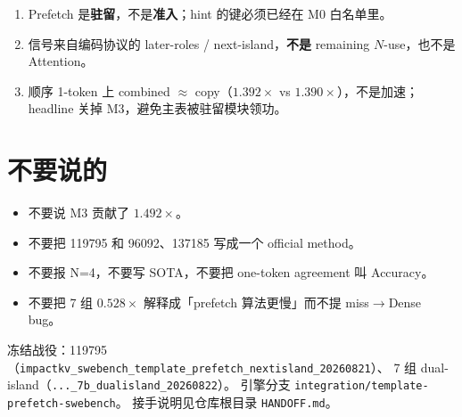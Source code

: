 \documentclass[UTF8,a4paper,11pt,fontset=fandol]{ctexart}
\begin{document}
\begin{enumerate}
  \item Prefetch 是\textbf{驻留}，不是\textbf{准入}；hint 的键必须已经在 M0 白名单里。
  \item 信号来自编码协议的 later-roles / next-island，\textbf{不是} remaining $N$-use，也不是 Attention。
  \item 顺序 1-token 上 combined $\approx$ copy（$1.392\times$ vs $1.390\times$），不是加速；
        headline 关掉 M3，避免主表被驻留模块领功。
\end{enumerate}

\section{不要说的}

\begin{itemize}
  \item 不要说 M3 贡献了 $1.492\times$。
  \item 不要把 119795 和 96092、137185 写成一个 official method。
  \item 不要报 N=4，不要写 SOTA，不要把 one-token agreement 叫 Accuracy。
  \item 不要把 7 组 $0.528\times$ 解释成「prefetch 算法更慢」而不提 miss$\to$Dense bug。
\end{itemize}

\vspace{0.8em}
\noindent\small
冻结战役：119795（\texttt{impactkv\_swebench\_template\_prefetch\_nextisland\_20260821}）、
7 组 dual-island（\texttt{...\_7b\_dualisland\_20260822}）。
引擎分支 \texttt{integration/template-prefetch-swebench}。
接手说明见仓库根目录 \texttt{HANDOFF.md}。
\end{document}
